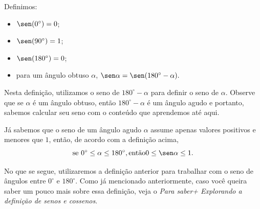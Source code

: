 Definimos:
\begin{itemize}[topsep=0pt, itemsep=0pt]
\item $\sen(0^\circ)= 0$;
\item $\sen(90^\circ)= 1$;
\item $\sen(180^\circ)= 0$;
\item para um ângulo obtuso $\alpha$, $\sen\alpha=\sen(180^\circ-\alpha).$
\end{itemize}

Nesta definição, utilizamos o seno de $180^\circ-\alpha$ para definir o seno de $\alpha$. Observe que se $\alpha$ é um ângulo obtuso, então $180^\circ-\alpha$ é um ângulo agudo e portanto, sabemos calcular seu seno com o conteúdo que aprendemos até aqui. 

\begin{observation}{}
Já sabemos que o seno de um ângulo agudo $\alpha$ assume apenas valores positivos e menores que $1$, então, de acordo com a definição acima,  
$$\text{se }0^\circ \leq\alpha \leq180^\circ, \text{então} 0\leq\sen\alpha\leq 1.$$
\end{observation}

No que se segue, utilizaremos a definição anterior para trabalhar com o seno de ângulos entre $0^\circ$ e $180^\circ$. Como já mencionado anteriormente, caso você queira saber um pouco mais sobre essa definição, veja o \textit{Para saber+ Explorando a definição de senos e cossenos}. 

